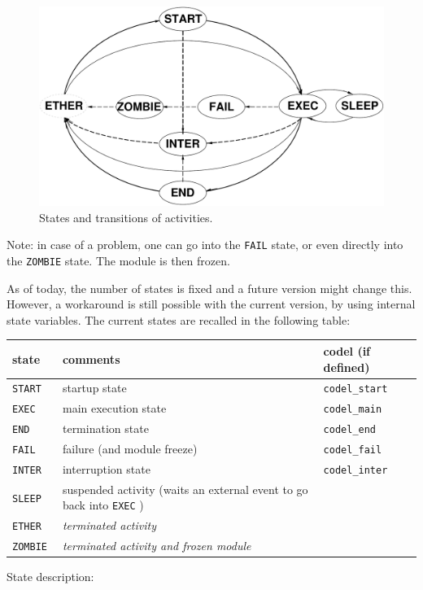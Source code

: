 \begin{figure}[htbp]
\centering
\includegraphics[width=0.8\hsize]{fig/activity-states}
\caption{States and transitions of activities.}
\label{fig|states}
\end{figure}

Note: in case of a problem, one can go into the {\tt FAIL} state, or even
directly into the {\tt ZOMBIE} state. The module is then frozen.

As of today, the  number of states is fixed  and  a future version  might
change this.  However, a workaround  is  still possible with the  current
version, by using internal   state   variables. The current  states   are
recalled in the following table:

\bigbreak

{\small\begin{tabularx}{0.8\linewidth}{|l||X|l|}
\hline
state 	& comments 	& codel (if defined)	  \\
\hline
\tt START  & startup state 
		& \tt codel\_start 	\\
\tt EXEC   & main execution state & \tt codel\_main  \\
\tt END    & termination state 	& \tt codel\_end \\
\tt FAIL   & failure (and module freeze) \em 
					& \tt codel\_fail \\
\hline
\tt INTER  & interruption state 
					& \tt codel\_inter  \\
\hline
\tt SLEEP     	&  suspended activity (waits an external event to go back
into  {\tt EXEC} ) & \\
\tt ETHER    	& \em terminated activity  & \\
\tt ZOMBIE   	& \em terminated activity and frozen module & \\
\hline
\end{tabularx}}

\bigbreak

State description:


